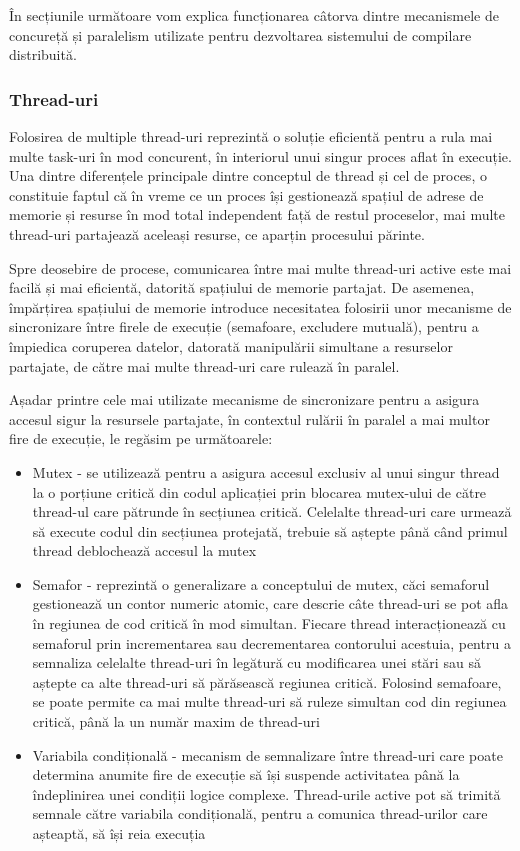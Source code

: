 În secțiunile următoare vom explica funcționarea câtorva dintre mecanismele de concureță și paralelism utilizate pentru dezvoltarea
sistemului de compilare distribuită.

\subsubsection{Thread-uri}

Folosirea de multiple thread-uri\cite{williams2019c++} reprezintă o soluție eficientă pentru a rula mai multe task-uri în mod concurent, în
interiorul unui singur proces aflat în execuție. Una dintre diferențele principale dintre conceptul de thread și cel
de proces, o constituie faptul că în vreme ce un proces își gestionează spațiul de adrese de memorie și resurse în mod total
independent față de restul proceselor, mai multe thread-uri partajează aceleași resurse, ce aparțin procesului părinte.

Spre deosebire de procese, comunicarea între mai multe thread-uri active este mai facilă și mai eficientă, datorită 
spațiului de memorie partajat. De asemenea, împărțirea spațiului de memorie introduce necesitatea folosirii
unor mecanisme de sincronizare între firele de execuție (semafoare, excludere mutuală), pentru a împiedica coruperea datelor,
datorată manipulării simultane a resurselor partajate, de către mai multe thread-uri care rulează în paralel. 

Așadar printre cele mai utilizate mecanisme de sincronizare\cite{reguera2025asynchronous} pentru a asigura accesul sigur la resursele partajate,
în contextul rulării în paralel a mai multor fire de execuție, le regăsim pe următoarele:

\begin{itemize}
    \item Mutex - se utilizează pentru a asigura accesul exclusiv al unui singur thread la o porțiune critică din codul aplicației
    prin blocarea mutex-ului de către thread-ul care pătrunde în secțiunea critică. Celelalte thread-uri care urmează să execute codul
    din secțiunea protejată, trebuie să aștepte până când primul thread deblochează accesul la mutex
    \item Semafor - reprezintă o generalizare a conceptului de mutex, căci semaforul gestionează un contor numeric atomic, care descrie câte
    thread-uri se pot afla în regiunea de cod critică în mod simultan. Fiecare thread interacționează cu semaforul prin incrementarea sau
    decrementarea contorului acestuia, pentru a semnaliza celelalte thread-uri în legătură cu modificarea unei stări sau să aștepte ca alte
    thread-uri să părăsească regiunea critică. Folosind semafoare, se poate permite ca mai multe thread-uri să ruleze simultan cod din regiunea 
    critică, până la un număr maxim de thread-uri
    \item Variabila condițională - mecanism de semnalizare între thread-uri care poate determina anumite fire de execuție să își suspende activitatea
    până la îndeplinirea unei condiții logice complexe. Thread-urile active pot să trimită semnale către variabila condițională, pentru a comunica
    thread-urilor care așteaptă, să își reia execuția
\end{itemize}

